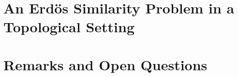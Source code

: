 \documentclass[12pt,oneside]{sfsuthesis}
\begin{document}
\chapter{An Erd\"{o}s Similarity Problem in a Topological Setting}



\chapter{Remarks and Open Questions}



\printbibliography
\end{document}
